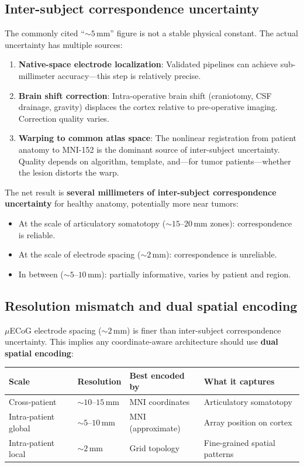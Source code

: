 \documentclass[11pt,letterpaper]{article}
\begin{document}
\subsection{Inter-subject correspondence uncertainty}

The commonly cited ``${\sim}5$\,mm'' figure is not a stable physical constant. The actual uncertainty has multiple sources:

\begin{enumerate}[leftmargin=2em]
\item \textbf{Native-space electrode localization}: Validated pipelines can achieve sub-millimeter accuracy---this step is relatively precise.
\item \textbf{Brain shift correction}: Intra-operative brain shift (craniotomy, CSF drainage, gravity) displaces the cortex relative to pre-operative imaging. Correction quality varies.
\item \textbf{Warping to common atlas space}: The nonlinear registration from patient anatomy to MNI-152 is the dominant source of inter-subject uncertainty. Quality depends on algorithm, template, and---for tumor patients---whether the lesion distorts the warp.
\end{enumerate}

The net result is \textbf{several millimeters of inter-subject correspondence uncertainty} for healthy anatomy, potentially more near tumors:
\begin{itemize}[leftmargin=2em]
\item At the scale of articulatory somatotopy (${\sim}15$--$20$\,mm zones): correspondence is reliable.
\item At the scale of electrode spacing (${\sim}2$\,mm): correspondence is unreliable.
\item In between (${\sim}5$--$10$\,mm): partially informative, varies by patient and region.
\end{itemize}

\subsection{Resolution mismatch and dual spatial encoding}

$\mu$ECoG electrode spacing (${\sim}2$\,mm) is finer than inter-subject correspondence uncertainty. This implies any coordinate-aware architecture should use \textbf{dual spatial encoding}:

\begin{table}[h]
\centering\small
\begin{tabular}{@{}llll@{}}
\toprule
\textbf{Scale} & \textbf{Resolution} & \textbf{Best encoded by} & \textbf{What it captures} \\
\midrule
Cross-patient & ${\sim}10$--$15$\,mm & MNI coordinates & Articulatory somatotopy \\
Intra-patient global & ${\sim}5$--$10$\,mm & MNI (approximate) & Array position on cortex \\
Intra-patient local & ${\sim}2$\,mm & Grid topology & Fine-grained spatial patterns \\
\bottomrule
\end{tabular}
\end{table}
\end{document}
